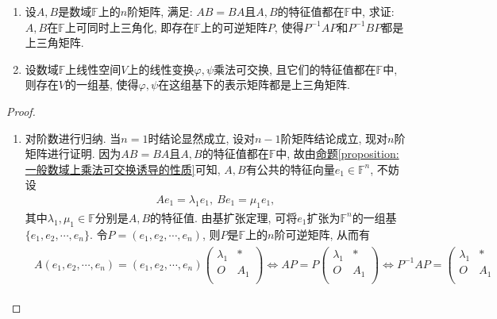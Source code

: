 \documentclass[../../main.tex]{subfiles}%
\begin{document}
\begin{proposition}\label{proposition:乘法可交换诱导同时上三角化}
\begin{enumerate}
\item 设\(A,B\)是数域\(\mathbb{F}\)上的\(n\)阶矩阵, 满足: \(AB = BA\)且\(A,B\)的特征值都在\(\mathbb{F}\)中, 求证: \(A,B\)在\(\mathbb{F}\)上可同时上三角化, 即存在\(\mathbb{F}\)上的可逆矩阵\(P\), 使得\(P^{-1}AP\)和\(P^{-1}BP\)都是上三角矩阵.

\item 设数域\(\mathbb{F}\)上线性空间\(V\)上的线性变换\(\varphi,\psi\)乘法可交换, 且它们的特征值都在\(\mathbb{F}\)中, 则存在\(V\)的一组基, 使得\(\varphi,\psi\)在这组基下的表示矩阵都是上三角矩阵. 
\end{enumerate}
\end{proposition}
\begin{proof}
\begin{enumerate}
\item 对阶数进行归纳. 当\(n = 1\)时结论显然成立, 设对\(n - 1\)阶矩阵结论成立, 现对\(n\)阶矩阵进行证明. 因为\(AB = BA\)且\(A,B\)的特征值都在\(\mathbb{F}\)中, 故由\hyperref[proposition:一般数域上乘法可交换诱导的性质]{命题\ref{proposition:一般数域上乘法可交换诱导的性质}}可知, \(A,B\)有公共的特征向量\(e_{1} \in \mathbb{F}^n\), 不妨设
\begin{align*}
Ae_{1}=\lambda_{1}e_{1},\ Be_{1}=\mu_{1}e_{1},
\end{align*}
其中\(\lambda_{1},\mu_{1} \in \mathbb{F}\)分别是\(A,B\)的特征值. 由基扩张定理, 可将\(e_{1}\)扩张为\(\mathbb{F}^n\)的一组基\(\{e_{1},e_{2},\cdots ,e_{n}\}\). 令\(P=(e_{1},e_{2},\cdots ,e_{n})\), 则\(P\)是\(\mathbb{F}\)上的\(n\)阶可逆矩阵, 从而有
\begin{align}\label{proposition-07-1.1}
\begin{aligned}
A\left( e_1,e_2,\cdots ,e_n \right) =\left( e_1,e_2,\cdots ,e_n \right) \left( \begin{matrix}
\lambda _1&		*\\
O&		A_1\\
\end{matrix} \right) \Leftrightarrow AP=P\left( \begin{matrix}
\lambda _1&		*\\
O&		A_1\\
\end{matrix} \right) \Leftrightarrow P^{-1}AP=\left( \begin{matrix}
\lambda _1&		*\\
O&		A_1\\

\end{matrix}
\end{aligned}
\end{align}
\end{enumerate}
\end{proof}
\end{document}
